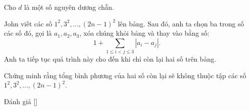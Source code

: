 \ifshowproblem
\begin{problem}\label{problem:BMO-2015-P1}
    Cho \( d \) là một số nguyên dương chẵn.

    John viết các số \( 1^2, 3^2, \ldots, (2n - 1)^2 \) lên bảng.  
    Sau đó, anh ta chọn ba trong số các số đó, gọi là \( a_1, a_2, a_3 \),  
    xóa chúng khỏi bảng và thay vào bằng số:
    \[
        1 + \sum_{1 \le i < j \le 3} |a_i - a_j|.
    \]
    Anh ta tiếp tục quá trình này cho đến khi chỉ còn lại hai số trên bảng.

    Chứng minh rằng tổng bình phương của hai số còn lại sẽ không thuộc tập các số  
    \( 1^2, 3^2, \ldots, (2n - 1)^2 \).
\end{problem}
\fi

\ifshowinfo
Đánh giá [\textbf{}]\footnotemark
{}
\fi